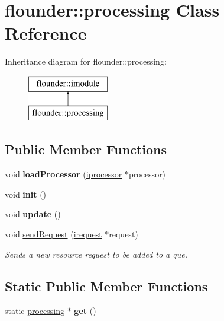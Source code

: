 \hypertarget{classflounder_1_1processing}{}\section{flounder\+:\+:processing Class Reference}
\label{classflounder_1_1processing}
Inheritance diagram for flounder\+:\+:processing\+:\begin{figure}[H]
\begin{center}
\leavevmode
\includegraphics[height=2.000000cm]{classflounder_1_1processing}
\end{center}
\end{figure}
\subsection*{Public Member Functions}
\begin{DoxyCompactItemize}
\item 
\mbox{\label{classflounder_1_1processing_a16372c976ba80a8b5cce9aa8afa5be6c}} 
void {\bfseries load\+Processor} (\hyperlink{classflounder_1_1iprocessor}{iprocessor} $\ast$processor)
\item 
\mbox{\label{classflounder_1_1processing_af4df3d8b578c2831a0e5ff38c0f48f90}} 
void {\bfseries init} ()
\item 
\mbox{\label{classflounder_1_1processing_a6841aa8834d27d41540b50f5cb0d25b5}} 
void {\bfseries update} ()
\item 
void \hyperlink{classflounder_1_1processing_addb84aad44d50ae3fa9513cddcea9968}{send\+Request} (\hyperlink{classflounder_1_1irequest}{irequest} $\ast$request)
\begin{DoxyCompactList}\small\item\em Sends a new resource request to be added to a que. \end{DoxyCompactList}\end{DoxyCompactItemize}
\subsection*{Static Public Member Functions}
\begin{DoxyCompactItemize}
\item 
\mbox{\label{classflounder_1_1processing_a9d533a541a2a514d201ff2c37782d44d}} 
static \hyperlink{classflounder_1_1processing}{processing} $\ast$ {\bfseries get} ()
\end{DoxyCompactItemize}
